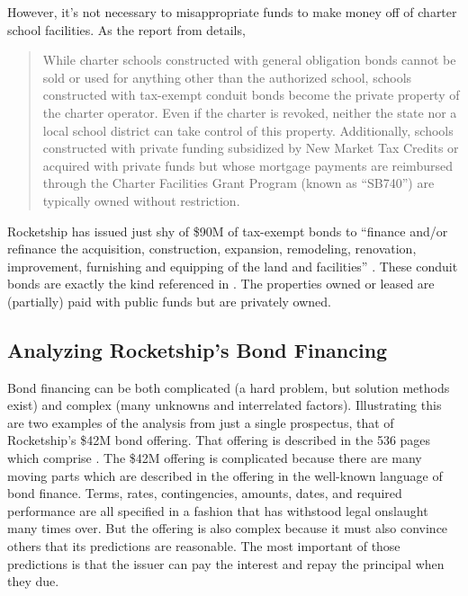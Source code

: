 However, it's not necessary to misappropriate funds to make money off of charter school facilities. As the report  from \citeauthor{ITPT2018} details,

\begin{quotation}\noindent\OnehalfSpacing%
While charter schools constructed with general obligation bonds cannot be sold or used for anything other than the authorized school, schools constructed with tax-exempt conduit bonds become the private property of the charter operator. Even if the charter is revoked, neither the state nor a local school district can take control of this property. Additionally, schools constructed with private funding subsidized by New Market Tax Credits or acquired with private funds but whose mortgage payments are reimbursed through the Charter Facilities Grant Program (known as “SB740”) are typically owned without restriction.\\ 
\end{quotation}

Rocketship has issued just shy of \$90M of tax-exempt bonds to ``finance and/or refinance the acquisition, construction,
expansion, remodeling, renovation, improvement, furnishing and equipping of the land and facilities''  \parencite{CSFA2015,CSFA2015a,CSFA2016,CSFA2017,CSFA2017a}. These conduit bonds are exactly the kind referenced in \textcite{ITPT2018}. The properties owned or leased are (partially) paid with public funds but are privately owned.

\subsection{Analyzing Rocketship's Bond Financing}\indent

Bond financing can be both complicated (a hard problem, but solution methods exist) and complex (many unknowns and interrelated factors). Illustrating this are two examples of the analysis from just a single prospectus, that of Rocketship's \$42M bond offering. That offering is described in the 536 pages which comprise . The \$42M offering is complicated because there are many moving parts which are described in the offering in the well-known language of bond finance. Terms, rates, contingencies, amounts, dates, and required performance are all specified in a fashion that has withstood legal onslaught many times over. But the offering is also complex because it must also convince others that its predictions are reasonable. The most important of those predictions is that the issuer can pay the interest and repay the principal when they due.

